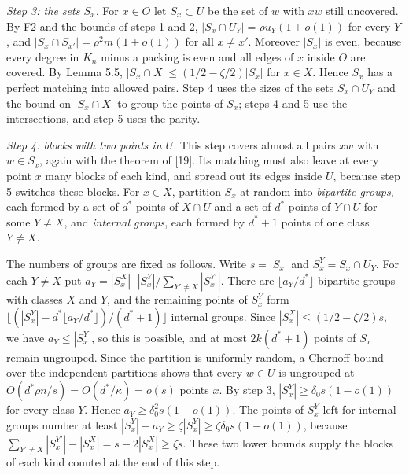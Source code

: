 \documentclass[english,11pt,a4paper]{article}
\begin{document}
\emph{Step 3: the sets \(S_x\).} For \(x\in O\) let \(S_x\subset U\) be the set of \(w\) with \(xw\) still uncovered. By F2 and the bounds of steps 1 and 2, \(|S_x\cap U_Y|=\rho u_Y(1\pm o(1))\) for every \(Y\), and \(|S_x\cap S_{x'}|=\rho^2m(1\pm o(1))\) for all \(x\ne x'\). Moreover \(|S_x|\) is even, because every degree in \(K_n\) minus a packing is even and all edges of \(x\) inside \(O\) are covered. By Lemma 5.5, \(|S_x\cap X|\le(1/2-\zeta/2)|S_x|\) for \(x\in X\). Hence \(S_x\) has a perfect matching into allowed pairs. Step 4 uses the sizes of the sets \(S_x\cap U_Y\) and the bound on \(|S_x\cap X|\) to group the points of \(S_x\); steps 4 and 5 use the intersections, and step 5 uses the parity.

\emph{Step 4: blocks with two points in \(U\).} This step covers almost all pairs \(xw\) with \(w\in S_x\), again with the theorem of {[}19{]}. Its matching must also leave at every point \(x\) many blocks of each kind, and spread out its edges inside \(U\), because step 5 switches these blocks. For \(x\in X\), partition \(S_x\) at random into \emph{bipartite groups}, each formed by a set of \(d^*\) points of \(X\cap U\) and a set of \(d^*\) points of \(Y\cap U\) for some \(Y\ne X\), and \emph{internal groups}, each formed by \(d^*+1\) points of one class \(Y\ne X\).

The numbers of groups are fixed as follows. Write \(s=|S_x|\) and \(S_x^Y=S_x\cap U_Y\). For each \(Y\ne X\) put \(a_Y=|S_x^X|\cdot|S_x^Y|/\sum_{Y'\ne X}|S_x^{Y'}|\). There are \(\lfloor a_Y/d^*\rfloor\) bipartite groups with classes \(X\) and \(Y\), and the remaining points of \(S_x^Y\) form \(\lfloor(|S_x^Y|-d^*\lfloor a_Y/d^*\rfloor)/(d^*+1)\rfloor\) internal groups. Since \(|S_x^X|\le(1/2-\zeta/2)s\), we have \(a_Y\le|S_x^Y|\), so this is possible, and at most \(2k(d^*+1)\) points of \(S_x\) remain ungrouped. Since the partition is uniformly random, a Chernoff bound over the independent partitions shows that every \(w\in U\) is ungrouped at \(O(d^*\rho n/s)=O(d^*/\kappa)=o(s)\) points \(x\). By step 3, \(|S_x^Y|\ge\delta_0s(1-o(1))\) for every class \(Y\). Hence \(a_Y\ge\delta_0^2s(1-o(1))\). The points of \(S_x^Y\) left for internal groups number at least \(|S_x^Y|-a_Y\ge\zeta|S_x^Y|\ge\zeta\delta_0s(1-o(1))\), because \(\sum_{Y'\ne X}|S_x^{Y'}|-|S_x^X|=s-2|S_x^X|\ge\zeta s\). These two lower bounds supply the blocks of each kind counted at the end of this step.
\end{document}
